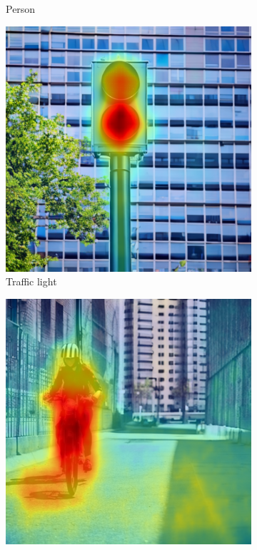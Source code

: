 \begin{figure}
\begin{subfigure}{0.24\columnwidth}
   \caption{Person}
   \label{subfig:dataset-example-person-daam-linear}
  \end{subfigure}
  \begin{subfigure}{0.24\columnwidth}
   \includegraphics[width=\columnwidth]{img/4-experiments/example-linear-daam-overlay-traffic light.png}
   \caption{Traffic light}
   \label{subfig:dataset-example-traffic-daam-linear}
  \end{subfigure}
  \begin{subfigure}{0.24\columnwidth}
   \includegraphics[width=\columnwidth]{img/4-experiments/example-linear-daam-overlay-rider.png}

\end{subfigure}
\end{figure}
